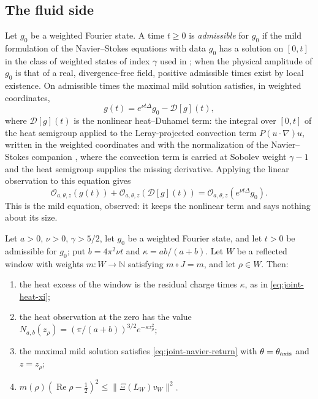 \subsection{The fluid side}

Let \(g_{0}\) be a weighted Fourier state.  A time
\(t\ge0\) is \emph{admissible} for \(g_{0}\) if the mild formulation of
the Navier--Stokes equations with data \(g_{0}\) has a solution on
\([0,t]\) in the class of weighted states of index \(\gamma\) used in
\cite{Tsiokos2026NavierStokes}; when the physical amplitude of \(g_{0}\)
is that of a real, divergence-free field, positive admissible times
exist by local existence.  On admissible times the maximal mild solution
satisfies, in weighted coordinates,
\[
  g(t)=e^{\nu t\Delta}g_{0}-\mathcal D[g](t),
\]
where \(\mathcal D[g](t)\) is the nonlinear heat--Duhamel term: the
integral over \([0,t]\) of the heat semigroup applied to the
Leray-projected convection term \(P(u\cdot\nabla)u\), written in the
weighted coordinates and with the normalization of the Navier--Stokes
companion \cite{Tsiokos2026NavierStokes}, where the convection term is
carried at Sobolev weight \(\gamma-1\) and the heat semigroup supplies
the missing derivative.  Applying the linear observation to this equation
gives
\begin{equation}
\label{eq:joint-navier-return}
  \mathcal O_{a,\theta,z}(g(t))
  +\mathcal O_{a,\theta,z}(\mathcal D[g](t))
  =\mathcal O_{a,\theta,z}(e^{\nu t\Delta}g_{0}).
\end{equation}
This is the mild equation, observed: it keeps the nonlinear term and
says nothing about its size.

\begin{theorem}
\label{thm:joint-gaussian-return}
Let \(a>0\), \(\nu>0\), \(\gamma>5/2\), let \(g_{0}\) be a weighted
Fourier state, and let \(t>0\) be admissible for \(g_{0}\); put
\(b=4\pi^{2}\nu t\) and \(\kappa=ab/(a+b)\).  Let \(W\) be a reflected
window with weights \(m:W\to\mathbb N\) satisfying \(m\circ J=m\), and
let \(\rho\in W\).  Then:
\begin{enumerate}
\item the heat excess of the window is the residual charge times
  \(\kappa\), as in \eqref{eq:joint-heat-xi};
\item the heat observation at the zero has the value
  \(N_{a,b}(z_{\rho})=(\pi/(a+b))^{3/2}e^{-\kappa z_{\rho}^{2}}\);
\item the maximal mild solution satisfies \eqref{eq:joint-navier-return}
  with \(\theta=\theta_{\rm axis}\) and \(z=z_{\rho}\);
\item \(m(\rho)(\operatorname{Re}\rho-\frac12)^{2}\le
  \|\Xi(L_{W})v_{W}\|^{2}\).
\end{enumerate}
\end{theorem}

